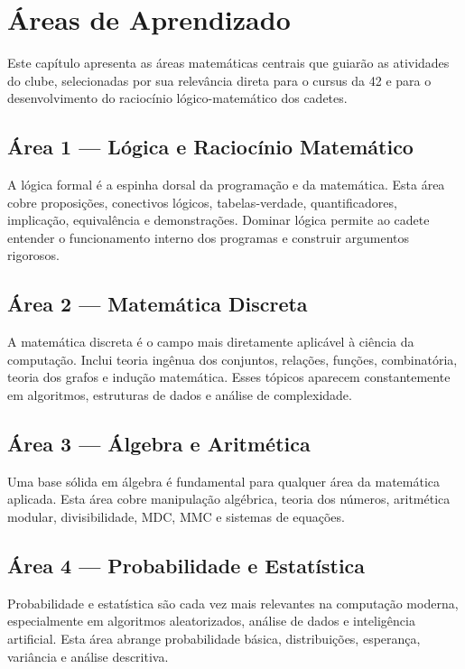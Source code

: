 \documentclass[12pt, a4paper]{article}
\begin{document}
\clearpage

\section{Áreas de Aprendizado}

Este capítulo apresenta as áreas matemáticas centrais que guiarão as atividades do clube,
selecionadas por sua relevância direta para o cursus da 42 e para o desenvolvimento do
raciocínio lógico-matemático dos cadetes.

\subsection{Área 1 --- Lógica e Raciocínio Matemático}

A lógica formal é a espinha dorsal da programação e da matemática. Esta área cobre
proposições, conectivos lógicos, tabelas-verdade, quantificadores, implicação, equivalência
e demonstrações. Dominar lógica permite ao cadete entender o funcionamento interno dos
programas e construir argumentos rigorosos.

\subsection{Área 2 --- Matemática Discreta}

A matemática discreta é o campo mais diretamente aplicável à ciência da computação. Inclui
teoria ingênua dos conjuntos, relações, funções, combinatória, teoria dos grafos e indução
matemática. Esses tópicos aparecem constantemente em algoritmos, estruturas de dados e
análise de complexidade.

\subsection{Área 3 --- Álgebra e Aritmética}

Uma base sólida em álgebra é fundamental para qualquer área da matemática aplicada. Esta
área cobre manipulação algébrica, teoria dos números, aritmética modular, divisibilidade,
MDC, MMC e sistemas de equações.

\subsection{Área 4 --- Probabilidade e Estatística}

Probabilidade e estatística são cada vez mais relevantes na computação moderna,
especialmente em algoritmos aleatorizados, análise de dados e inteligência artificial.
Esta área abrange probabilidade básica, distribuições, esperança, variância e análise
descritiva.
\end{document}
